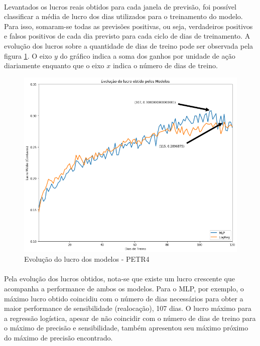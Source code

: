 \documentclass[grad,numbers]{coppe}
\begin{document}
            \paragraph{}Levantados os lucros reais obtidos para cada janela de previsão, foi possível classificar a média de lucro dos dias utilizados para o treinamento do modelo. Para isso, somaram-se todas as previsões positivas, ou seja, verdadeiros positivos e falsos positivos de cada dia previsto para cada ciclo de dias de treinamento. A evolução dos lucros sobre a quantidade de dias de treino pode ser observada pela figura \ref{img:lucro}. O eixo $y$ do gráfico indica a soma dos ganhos por unidade de ação diariamente enquanto que o eixo $x$ indica o número de dias de treino.
            
            \begin{figure}[h!]
                \caption{Evolução do lucro dos modelos - PETR4}
                \label{img:lucro}
                \includegraphics[width=13.1cm]{lucro.png}
                \centering
            \end{figure}
            
            \paragraph{}Pela evolução dos lucros obtidos, nota-se que existe um lucro crescente que acompanha a performance de ambos os modelos. Para o MLP, por exemplo, o máximo lucro obtido coincidiu com o número de dias necessários para obter a maior performance de sensibilidade (realocação), 107 dias. O lucro máximo para a regressão logística, apesar de não coincidir com o número de dias de treino para o máximo de precisão e sensibilidade, também apresentou seu máximo próximo do máximo de precisão encontrado. 
            
\end{document}

